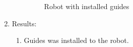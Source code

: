 \begin{enumerate}
\begin{enumerate}
\begin{figure}[H]
\begin{minipage}[h]{0.47\linewidth}
      	\end{minipage}
      	\caption{Robot with installed guides}
      \end{figure}
      
    \end{enumerate}
    
	\item Results: 
	\begin{enumerate}
	  \item Guides was installed to the robot. 
	  

\end{enumerate}
\end{enumerate}
